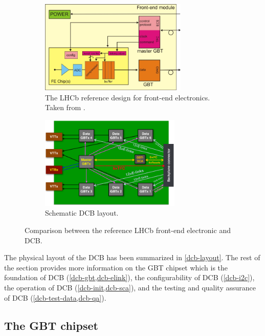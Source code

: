 \begin{figure}[!htb]
    \centering
    \begin{subfigure}[t]{0.46\textwidth}
        \centering
        \includegraphics[height=12em]{./figs-ut-upgrade/dcb/lhcb_ref_fe.pdf}
        \caption{
            The LHCb reference design for front-end electronics.
            Taken from \cite{Wyllie:2011sya}.
        }
        \label{fig:lhcb-ref-fe}
    \end{subfigure}
    \hfill
    \begin{subfigure}[t]{0.46\textwidth}
        \centering
        \includegraphics[height=12em]{./figs-ut-upgrade/dcb/dcb_schematic.pdf}
        \caption{
            Schematic DCB layout.
        }
        \label{fig:dcb-schematic}
    \end{subfigure}

    \caption{
        Comparison between the reference LHCb front-end electronic and DCB.
    }
\end{figure}

The physical layout of the DCB has been summarized in \cref{dcb-layout}.
The rest of the section provides more information
on the GBT chipset which is the foundation of DCB (\cref{dcb-gbt,dcb-elink}),
the configurability of DCB (\cref{dcb-i2c}),
the operation of DCB (\cref{dcb-init,dcb-sca}),
and the testing and quality assurance of DCB (\cref{dcb-test-data,dcb-qa}).


\subsection{The GBT chipset}
\label{dcb-gbt}

